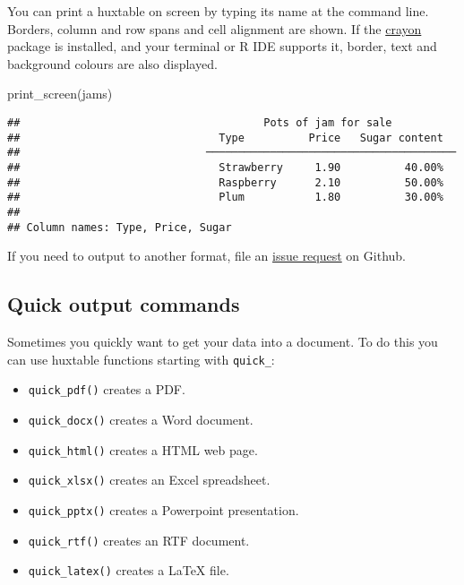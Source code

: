 \documentclass[
]{article}
\newenvironment{Shaded}{\begin{snugshade}}{\end{snugshade}}
\newcommand{\FunctionTok}[1]{\textcolor[rgb]{0.00,0.00,0.00}{#1}}
\newcommand{\NormalTok}[1]{#1}
\providecommand{\tightlist}{%
  \setlength{\itemsep}{0pt}\setlength{\parskip}{0pt}}
\begin{document}
You can print a huxtable on screen by typing its name at the command
line. Borders, column and row spans and cell alignment are shown. If the
\href{https://cran.r-project.org/package=crayon}{crayon} package is
installed, and your terminal or R IDE supports it, border, text and
background colours are also displayed.

\begin{Shaded}
\begin{Highlighting}[]
\FunctionTok{print\_screen}\NormalTok{(jams)}
\end{Highlighting}
\end{Shaded}

\begin{verbatim}
##                                      Pots of jam for sale                                      
##                               Type          Price   Sugar content  
##                             ───────────────────────────────────────
##                               Strawberry     1.90          40.00%  
##                               Raspberry      2.10          50.00%  
##                               Plum           1.80          30.00%  
## 
## Column names: Type, Price, Sugar
\end{verbatim}

\FloatBarrier

If you need to output to another format, file an
\href{https://github.com/hughjonesd/huxtable/}{issue request} on Github.

\hypertarget{quick-output-commands}{%
\subsection{Quick output commands}\label{quick-output-commands}}

Sometimes you quickly want to get your data into a document. To do this
you can use huxtable functions starting with \texttt{quick\_}:

\begin{itemize}
\tightlist
\item
  \texttt{quick\_pdf()} creates a PDF.
\item
  \texttt{quick\_docx()} creates a Word document.
\item
  \texttt{quick\_html()} creates a HTML web page.
\item
  \texttt{quick\_xlsx()} creates an Excel spreadsheet.
\item
  \texttt{quick\_pptx()} creates a Powerpoint presentation.
\item
  \texttt{quick\_rtf()} creates an RTF document.
\item
  \texttt{quick\_latex()} creates a LaTeX file.
\end{itemize}
\end{document}
